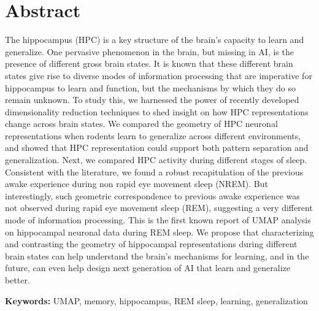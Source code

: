 

\section*{Abstract}

The hippocampus (HPC) is a key structure of the brain's capacity to learn and generalize. One pervasive phenomenon in the brain, but missing in AI, is the presence of different gross brain states. It is known that these different brain states give rise to diverse modes of information processing that are imperative for hippocampus to learn and function, but the mechanisms by which they do so remain unknown. To study this, we harnessed the power of recently developed dimensionality reduction techniques to shed insight on how HPC representations change across brain states. We compared the geometry of HPC neuronal representations when rodents learn to generalize across different environments, and showed that HPC representation could support both pattern separation and generalization. Next, we compared HPC activity during different stages of sleep. Consistent with the literature, we found a robust recapitulation of the previous awake experience during non rapid eye movement sleep (NREM). But interestingly, such geometric correspondence to previous awake experience was not observed during rapid eye movement sleep (REM), suggesting a very different mode of information processing. This is the first known report of UMAP analysis on hippocampal neuronal data during REM sleep. We propose that characterizing and contrasting the geometry of hippocampal representations during different brain states can help understand the brain's mechanisms for learning, and in the future, can even help design next generation of AI that learn and generalize better.

\bigskip
\noindent\textbf{Keywords:} UMAP, memory, hippocampus, REM sleep, learning, generalization

